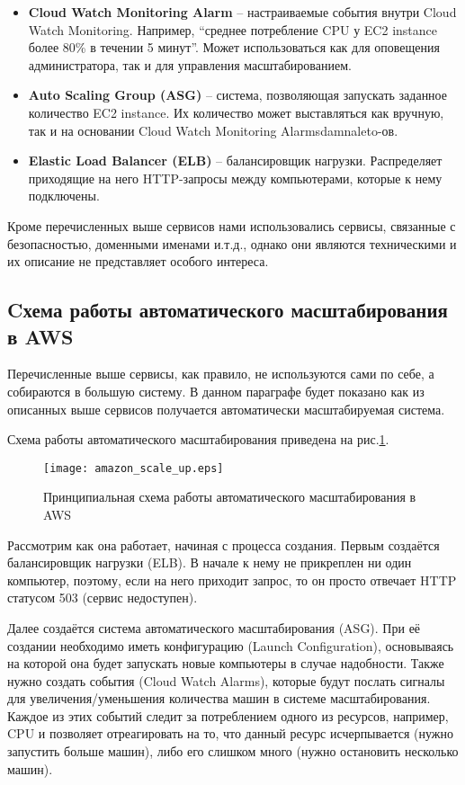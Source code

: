 \begin{itemize}
	\item \textbf{Cloud Watch Monitoring Alarm} -- настраиваемые события внутри Cloud Watch Monitoring. Например, ``среднее потребление CPU у EC2 instance более 80\% в течении 5 минут''. Может использоваться как для оповещения администратора, так и для управления масштабированием.
	\item \textbf{Auto Scaling Group (ASG)} -- система, позволяющая запускать заданное количество EC2 instance. Их количество может выставляться как вручную, так и на основании Cloud Watch Monitoring Alarmsdamnaleto-ов.
	\item \textbf{Elastic Load Balancer (ELB)} -- балансировщик нагрузки. Распределяет приходящие на него HTTP-запросы между компьютерами, которые к нему подключены.
\end{itemize}


Кроме перечисленных выше сервисов нами использовались сервисы, связанные с безопасностью, доменными именами и.т.д., однако они являются техническими и их описание не представляет особого интереса.

\subsection{Cхема работы автоматического масштабирования в AWS}
	Перечисленные выше сервисы, как правило, не используются сами по себе, а собираются в большую систему. В данном параграфе будет показано как из описанных выше сервисов получается автоматически масштабируемая система.
	
	Схема работы автоматического масштабирования приведена на рис.\ref{fig:aws_autoscaling}.
	
\begin{figure}[h]
    \centering
    \texttt{[image: amazon\_scale\_up.eps]} 
    \caption{Принципиальная схема работы автоматического масштабирования в AWS}
    \label{fig:aws_autoscaling}
\end{figure}
	Рассмотрим как она работает, начиная с процесса создания. Первым создаётся балансировщик нагрузки (ELB). В начале к нему не прикреплен ни один компьютер, поэтому, если на него приходит запрос, то он просто отвечает HTTP статусом 503 (сервис недоступен).
	
	Далее создаётся система автоматического масштабирования (ASG). При её создании необходимо иметь конфигурацию (Launch Configuration), основываясь на которой она будет запускать новые компьютеры в случае надобности. Также нужно создать события (Cloud Watch Alarms), которые будут послать сигналы для увеличения/уменьшения количества машин в системе масштабирования. Каждое из этих событий следит за потреблением одного из ресурсов, например, CPU и позволяет отреагировать на то, что данный ресурс исчерпывается (нужно запустить больше машин), либо его слишком много (нужно остановить несколько машин).
	
